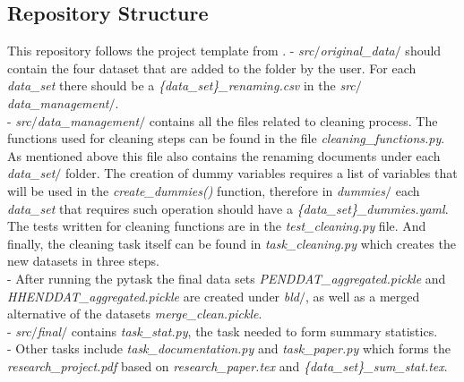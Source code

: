 \documentclass[11pt, a4paper, leqno]{article}
\begin{document}
\subsection{Repository Structure}
This repository follows the project template from \citet{GaudeckerEconProjectTemplates}.
-  \emph {src$/$original\_data$/$} should contain the four dataset that are added to the folder by the user. For each \emph {data\_set} there should be a  \emph {\{data\_set\}\_renaming.csv} in the \emph {src$/$data\_management$/$}.\\[12pt]
- \emph {src$/$data\_management$/$} contains all the files related to cleaning process. The functions used for cleaning steps can be found in the file \emph {cleaning\_functions.py}. As mentioned above this file also contains the renaming documents under each \emph {data\_set$/$} folder. The creation of dummy variables requires a list of variables that will be used in the \emph {create\_dummies()} function, therefore in \emph {dummies$/$} each \emph {data\_set} that requires such operation should have a \emph {\{data\_set\}\_dummies.yaml}. The tests written for cleaning functions are in the \emph {test\_cleaning.py} file. And finally, the cleaning task itself can be found in \emph {task\_cleaning.py} which creates the new datasets in three steps.\\[12pt]
- After running the pytask the final data sets \emph {PENDDAT\_aggregated.pickle} and \emph {HHENDDAT\_aggregated.pickle} are created under \emph {bld$/$}, as well as a merged alternative of the datasets \emph {merge\_clean.pickle}.\\[12pt]
- \emph {src$/$final$/$} contains \emph {task\_stat.py}, the task needed to form summary statistics.\\[12pt]
- Other tasks include \emph {task\_documentation.py} and \emph {task\_paper.py} which forms the \\ \emph {research\_project.pdf} based on \emph {research\_paper.tex} and \emph {\{data\_set\}\_sum\_stat.tex}.
\end{document}
